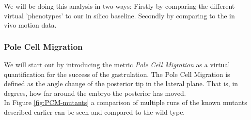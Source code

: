 We will be doing this analysis in two ways: Firstly by comparing the different virtual 'phenotypes' to our in silico baseline. Secondly by comparing to the in vivo motion data.  

\subsubsection{Pole Cell Migration}
We will start out by introducing the metric \textit{Pole Cell Migration} as a virtual quantification for the success of the gastrulation. The Pole Cell Migration is defined as the angle change of the posterior tip in the lateral plane. That is, in degrees, how far around the embryo the posterior has moved.\\



In Figure \ref{fig:PCM-mutants} a comparison of multiple runs of the known mutants described earlier can be seen and compared to the wild-type.

